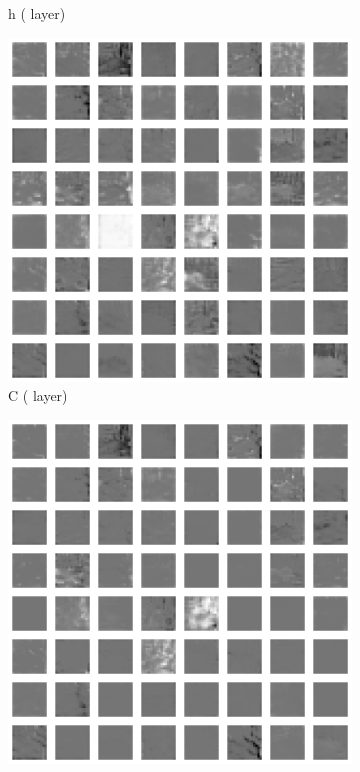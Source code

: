 \begin{figure}[h!tb]
\begin{subfigure}{0.24\textwidth}
  \caption{h \tiny{( layer)}}
  \label{fig:ucf-lrep2}
  \vspace{.1cm}
\end{subfigure}
\begin{subfigure}{0.24\textwidth}
  \centering
  \includegraphics[width=0.92\linewidth]{figures/learned_rep/ucf/2c.png}
  \caption{C \tiny{( layer)}}
  \label{fig:ucf-lrep3}
  \vspace{.1cm}
\end{subfigure}
\begin{subfigure}{0.24\textwidth}
  \centering
  \includegraphics[width=0.92\linewidth]{figures/learned_rep/ucf/2h.png}

\end{subfigure}
\end{figure}
